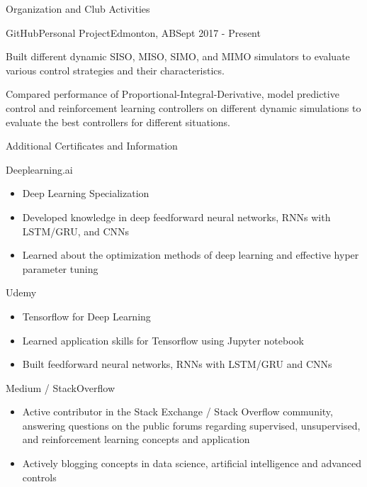 \documentclass{article}
\newlength{\tabin}
\newlength{\secsep}
\newcommand{\lineunder}{\vspace*{-8pt} \\ \hspace*{-6pt} \hrulefill \\ \vspace*{-15pt}}
\newenvironment{tabbedsection}[1]{
  \begin{list}{}{
      \setlength{\itemsep}{0pt}
      \setlength{\labelsep}{0pt}
      \setlength{\labelwidth}{0pt}
      \setlength{\leftmargin}{\tabin}
      \setlength{\rightmargin}{\tabin}
      \setlength{\listparindent}{0pt}
      \setlength{\parsep}{0pt}
      \setlength{\parskip}{0pt}
      \setlength{\partopsep}{0pt}
      \setlength{\topsep}{#1}
    }
  \item[]
}{\end{list}}
\newenvironment{resume_section}[1]{
  \filbreak
  \vspace{2\secsep}
  \textsc{\large#1}
  \lineunder
  \begin{tabbedsection}{\secsep}
}{\end{tabbedsection}}
\newenvironment{resume_subsection}[2][]{
  \textbf{#2} \hfill {\footnotesize #1} \hspace{2em}
  \begin{tabbedsection}{0.5\secsep}
}{\end{tabbedsection}}
\newenvironment{subitems}{
  \renewcommand{\labelitemi}{-}
  \begin{itemize}
      \setlength{\labelsep}{1em}
}{\end{itemize}}
\newenvironment{resume_employer}[4]{
  \vspace{\secsep}
  \textbf{#1} \\ 
  \indent {\small #2} \hfill {\footnotesize#3 (#4)}
  \begin{tabbedsection}{0pt}
  \begin{subitems}
}{\end{subitems}\end{tabbedsection}}
\begin{document}
\begin{resume_section}{Organization and Club Activities}
     \begin{resume_employer}{GitHub}{Personal Project}{Edmonton, AB}{Sept 2017 - Present}
        \item Built different dynamic SISO, MISO, SIMO, and MIMO simulators to evaluate various control strategies and their characteristics.
        \item Compared performance of Proportional-Integral-Derivative, model predictive control and reinforcement learning controllers on different dynamic simulations to evaluate the best controllers for different situations.
  \end{resume_employer}

\end{resume_section}



\begin{resume_section}{Additional Certificates and Information}
  
  \begin{resume_subsection}[Online (2018)]{Deeplearning.ai}
    \begin{subitems}
      \item Deep Learning Specialization
      \item Developed knowledge in deep feedforward neural networks, RNNs with LSTM/GRU, and CNNs
      \item Learned about the optimization methods of deep learning and effective hyper parameter tuning
     \end{subitems}
  \end{resume_subsection}
  
    \begin{resume_subsection}[Online (2018)]{Udemy}
    \begin{subitems}
      \item Tensorflow for Deep Learning
      \item Learned application skills for Tensorflow using Jupyter notebook
      \item Built feedforward neural networks, RNNs with LSTM/GRU and CNNs
     \end{subitems}
  \end{resume_subsection}
  
      \begin{resume_subsection}{Medium / StackOverflow}
    \begin{subitems}
      \item Active contributor in the Stack Exchange / Stack Overflow community, answering questions on the public forums regarding supervised, unsupervised, and reinforcement learning concepts and application
      \item Actively blogging concepts in data science, artificial intelligence and advanced controls
     \end{subitems}
  \end{resume_subsection}
 

\end{resume_section}
\end{document}
